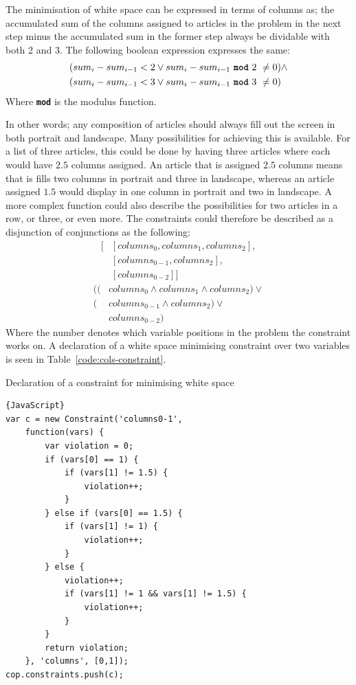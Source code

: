 The minimisation of white space can be expressed in terms of columns as; the accumulated sum of the columns assigned to articles in the problem in the next step minus the accumulated sum in the former step always be dividable with both 2 and 3. The following boolean expression expresses the same:
\begin{align*}
	&(sum_i-sum_{i-1} < 2 \vee sum_i-sum_{i-1}\ \texttt{\textbf{mod}}\ 2\ \neq 0) \wedge\\
	&(sum_i-sum_{i-1} < 3 \vee sum_i-sum_{i-1}\ \texttt{\textbf{mod}}\ 3\ \neq 0)
\end{align*}
Where \texttt{\textbf{mod}} is the modulus function.

In other words; any composition of articles should always fill out the screen in both portrait and landscape. Many possibilities for achieving this is available. For a list of three articles, this could be done by having three articles where each would have $2.5$ columns assigned. An article that is assigned $2.5$ columns means that is fills two columns in portrait and three in landscape, whereas an article assigned $1.5$ would display in one column in portrait and two in landscape. A more complex function could also describe the possibilities for two articles in a row, or three, or even more. The constraints could therefore be described as a disjunction of conjunctions as the following:
\begin{equation}
\begin{split}
[&[columns_0, columns_1, columns_2],\\
&[columns_{0-1}, columns_2],\\
&[columns_{0-2}]]
\end{split}
\label{eq:col-row}
\end{equation}
\begin{equation}
\begin{split}
((&columns_0 \wedge columns_1 \wedge columns_2) \vee\\
(&columns_{0-1} \wedge columns_2) \vee\\
&columns_{0-2})
\end{split}
\label{eq:col-row-logic}
\end{equation}
Where the number denotes which variable positions in the problem the constraint works on. A declaration of a white space minimising constraint over two variables is seen in Table~\ref{code:cols-constraint}.
\clearpage
\begin{table}[h!tp]
\caption{Declaration of a constraint for minimising white space}\label{code:cols-constraint}
\begin{lstlisting}{JavaScript}
var c = new Constraint('columns0-1',
	function(vars) {
		var violation = 0;
		if (vars[0] == 1) {
			if (vars[1] != 1.5) {
				violation++;
			}
		} else if (vars[0] == 1.5) {
			if (vars[1] != 1) {
				violation++;
			}
		} else {
			violation++;
			if (vars[1] != 1 && vars[1] != 1.5) {
				violation++;
			}
		}
		return violation;
	}, 'columns', [0,1]);
cop.constraints.push(c);
\end{lstlisting}
\end{table}

